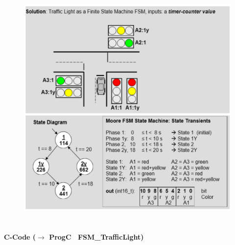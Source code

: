 	\begin{figure}[h]
    \centering
    \includegraphics[width=15cm, height=12.5cm]{Images/image159.png}
    \label{fig:Fig 111}
    \end{figure}

{\rot\bf C-Code	($\rightarrow$ ProgC \ FSM\_TrafficLight)}\\

